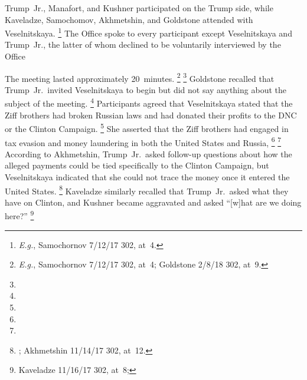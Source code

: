 Trump~Jr., Manafort, and Kushner participated on the Trump side, while Kaveladze, Samochomov, Akhmetshin, and Goldstone attended with Veselnitskaya.%
\footnote{\textit{E.g.}, Samochornov 7/12/17 302, at~4.}
The Office spoke to every participant except Veselnitskaya and Trump~Jr., the latter of whom declined to be voluntarily interviewed by the Office

The meeting lasted approximately 20~minutes.%
\footnote{\textit{E.g.}, Samochornov 7/12/17 302, at~4; Goldstone 2/8/18 302, at~9.}
\footnote{}
 Goldstone recalled that Trump~Jr.\ invited Veselnitskaya to begin but did not say anything about the subject of the meeting.%
\footnote{}
Participants agreed that Veselnitskaya stated that the Ziff brothers had broken Russian laws and had donated their profits to the DNC or the Clinton Campaign.%
\footnote{}
She asserted that the Ziff brothers had engaged in tax evasion and money laundering in both the United States and Russia,%
\footnote{}
\footnote{}
According to Akhmetshin, Trump~Jr.\ asked follow-up questions about how the alleged payments could be tied specifically to the Clinton Campaign, but Veselnitskaya indicated that she could not trace the money once it entered the United States.%
\footnote{; Akhmetshin 11/14/17 302, at~12.}
Kaveladze similarly recalled that Trump~Jr.\ asked what they have on Clinton, and Kushner became aggravated and asked ``[w]hat are we doing here?''%
\footnote{Kaveladze 11/16/17 302, at~8;
}

